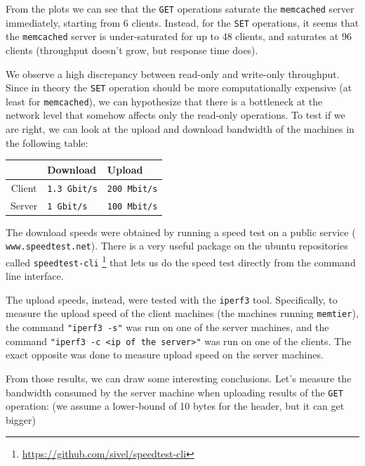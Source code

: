 \documentclass[11pt,a4paper]{article}
\renewcommand{\t}[1]{%
	{\texttt{#1}}}
\begin{document}

From the plots we can see that the \t{GET} operations saturate the \t{memcached} server immediately, starting from 6 clients. Instead, for the \t{SET} operations, it seems that the \t{memcached} server is under-saturated for up to 48 clients, and saturates at 96 clients (throughput doesn't grow, but response time does).

We observe a high discrepancy between read-only and write-only throughput.
Since in theory the \t{SET} operation should be more computationally expensive (at least for \t{memcached}), we can hypothesize that there is a bottleneck at the network level that somehow affects only the read-only operations.
To test if we are right, we can look at the upload and download bandwidth of the machines in the following table:

\begin{center}
	\def\arraystretch{1.5}
		\begin{tabular}{|c|l|l|}
			\hline  & Download          & Upload                    \\
			\hline Client &  \t{1.3 Gbit/s} &  \t{200 Mbit/s}                     \\
			\hline Server &  \t{1 Gbit/s}&   \t{100 Mbit/s}                \\
			\hline
		\end{tabular}
\end{center}

The download speeds were obtained by running a speed test on a public service (\t{www.speedtest.net}). There is a very useful package on the ubuntu repositories called \t{speedtest-cli} \footnote{\url{https://github.com/sivel/speedtest-cli}} that lets us do the speed test directly from the command line interface.

The upload speeds, instead, were tested with the \t{iperf3} tool. Specifically, to measure the upload speed of the client machines (the machines running \t{memtier}), the command \t{"iperf3 -s"} was run on one of the server machines, and the command \t{"iperf3 -c <ip of the server>"} was run on one of the clients. The exact opposite was done to measure upload speed on the server machines.

From those results, we can draw some interesting conclusions. Let's measure the bandwidth consumed by the server machine when uploading results of the \t{GET} operation:
(we assume a lower-bound of 10 bytes for the header, but it can get bigger)
\end{document}
